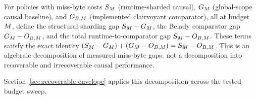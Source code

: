 \begin{definition}
\label{def:decomposition-terms}
For policies with miss-byte costs $S_M$ (runtime-sharded causal),
$G_M$ (global-scope causal baseline), and $O_{B,M}$ (implemented
clairvoyant comparator), all at budget $M$, define the structural
sharding gap $S_M-G_M$, the Belady comparator gap
$G_M-O_{B,M}$, and the total runtime-to-comparator gap
$S_M-O_{B,M}$. These terms satisfy the exact identity
$(S_M-G_M)+(G_M-O_{B,M})=S_M-O_{B,M}$.
This is an algebraic decomposition of measured miss-byte gaps, not a
decomposition into recoverable and irrecoverable causal performance.
\end{definition}

Section~\ref{sec:recoverable-envelope} applies this decomposition across
the tested budget sweep.
